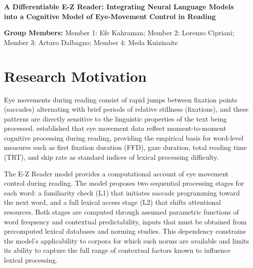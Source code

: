 \documentclass[12pt]{article}
\begin{document}
\newpage

\setcounter{page}{1}
\pagestyle{fancy}

\begin{center}
  \textbf{A Differentiable E-Z Reader: Integrating Neural Language Models\\
  into a Cognitive Model of Eye-Movement Control in Reading}
\end{center}

\vspace{6pt}
\noindent\textbf{Group Members:}\;
Member 1: Efe Kahraman;
Member 2: Lorenzo Cipriani;
Member 3: Arturo Dalbagno;
Member 4: Meda Kuizinaite{\hspace{2.2cm}}

\vspace{12pt}

\section{Research Motivation}

Eye movements during reading consist of rapid jumps between fixation points
(saccades) alternating with brief periods of relative stillness (fixations),
and these patterns are directly sensitive to the linguistic properties of the
text being processed. \citet{rayner1998eye} established that eye movement data
reflect moment-to-moment cognitive processing during reading, providing the
empirical basis for word-level measures such as first fixation duration (FFD),
gaze duration, total reading time (TRT), and skip rate as standard indices of
lexical processing difficulty.

The E-Z Reader model \citep{reichle1998toward} provides a computational
account of eye movement control during reading. The model proposes two
sequential processing stages for each word: a familiarity check (L1) that
initiates saccade programming toward the next word, and a full lexical access
stage (L2) that shifts attentional resources. Both stages are computed through
assumed parametric functions of word frequency and contextual predictability,
inputs that must be obtained from precomputed lexical databases and norming
studies. This dependency constrains the model's applicability to corpora for
which such norms are available and limits its ability to capture the full range
of contextual factors known to influence lexical processing.
\end{document}
